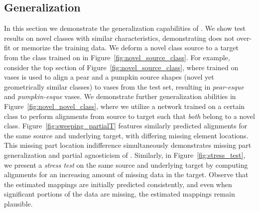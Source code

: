\documentclass[acmtog,timestamp]{acmart}%
\newcommand{\jsubfig}[2]{%
	\sbox\jsavebox{#1}%
	\parbox[t]{\wd\jsavebox}{\centering\usebox\jsavebox\\#2}%
	}
\begin{document}
\begin{comment}
 \hspace*{0.3cm} \hfill \jsubfig{\texttt{[image: figures/grid\_res/vase/sample860\_source.png]}}{source}%
\hfill \jsubfig{\texttt{[image: figures/grid\_res/vase/2x2/sample860\_targetPred.png]}}{$2\times2$}%
\hfill \jsubfig{\texttt{[image: figures/grid\_res/vase/4x4/sample860\_targetPred.png]}}{$4\times4$}%
\hfill \jsubfig{\texttt{[image: figures/grid\_res/vase/6x6/sample860\_targetPred.png]}}{$6\times6$}%
\hfill \jsubfig{\texttt{[image: figures/grid\_res/vase/7x7/sample860\_targetPred.png]}}{$7\times7$}%
\hfill \jsubfig{\texttt{[image: figures/grid\_res/vase/8x8/sample860\_targetPred.png]}}{$8\times8$}%
\hfill \jsubfig{\texttt{[image: figures/grid\_res/vase/sample860\_target.png]}}{target}%
\end{comment}\subsection{\ourmethod{} Generalization}%
In this section we demonstrate the generalization capabilities of \ourmethod{}. We show test results on novel classes with similar characteristics, demonstrating \ourmethod{} does not over-fit or memorize the training data. We deform a novel class source to a target from the class trained on in Figure~\ref{fig:novel_source_class}. For example, consider the top section of Figure~\ref{fig:novel_source_class}, where \ourmethod{} trained on vases is used to align a pear and a pumpkin source shapes (novel yet geometrically similar classes) to vases from the test set, resulting in \emph{pear-esque} and \emph{pumpkin-esque} vases. 
We demonstrate further generalization abilities in Figure~\ref{fig:novel_novel_class}, where we utilize a network trained on a certain class to perform alignments from source to target such that \emph{both} belong to a novel class. 
Figure~\ref{fig:sweeping_partialT} features similarly predicted \ourmethod{} alignments for the same source and underlying target, with differing missing element locations. This missing part location indifference simultaneously demonstrates missing part generalization and partial agnosticism of \ourmethod{}. Similarly, in Figure~\ref{fig:stress_test}, we present a \emph{stress test} on the same source and underlying target by computing alignments for an increasing amount of missing data in the target. Observe that the estimated mappings are initially predicted consistently, and even when significant portions of the data are missing, the estimated mappings remain plausible.
\end{document}

